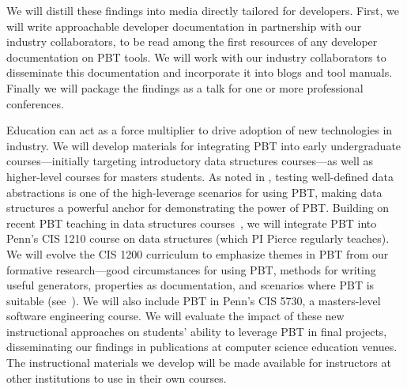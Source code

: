 We will distill these findings
into media directly tailored for developers. First, we will write
approachable developer documentation in partnership with our industry
collaborators, to be read among the first resources of any developer
documentation on PBT tools. We will work with our industry collaborators to
disseminate this documentation and incorporate it into blogs and tool
manuals. Finally we will package the findings as a talk for one or more
professional conferences.

%
Education can act as a force multiplier to drive adoption of new
technologies in industry.
We will develop materials for
integrating PBT into early undergraduate courses---initially targeting
introductory data structures
courses---as well as higher-level courses for masters students. As noted in , testing well-defined data
abstractions is one of the high-leverage scenarios for using PBT, making data
structures a powerful anchor for demonstrating the power of PBT.
%
Building on
recent PBT teaching in data structures
courses~\cite{wrenn2021using,nelson2021automated}, we will integrate PBT into
Penn's CIS 1210 course on data structures (which PI Pierce regularly teaches).
%
We
will evolve the CIS 1200 curriculum to emphasize themes in PBT from our
formative research---good circumstances for
using PBT, methods for writing useful generators, properties as
documentation, and scenarios where PBT is suitable
(see~).
%
We will also include PBT in Penn's CIS 5730, a masters-level software engineering
course.
%
We will evaluate the impact of these new
instructional approaches on students' ability to leverage PBT in final projects,
disseminating our findings in publications at computer science
education venues.
%
The instructional materials we develop will be made available for instructors at
other institutions to use in their own courses.


\immediate\closeout\workplanfile


